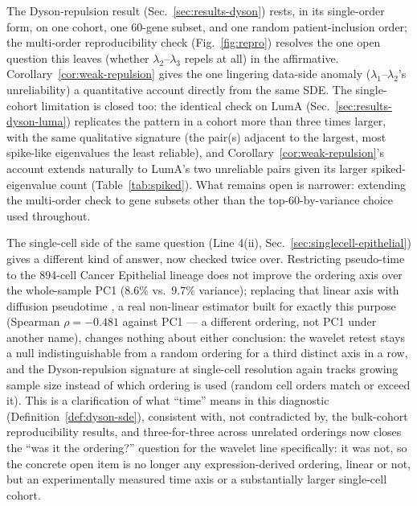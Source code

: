 \documentclass[11pt]{article}
\begin{document}
The Dyson-repulsion result (Sec.~\ref{sec:results-dyson}) rests, in its
single-order form, on one cohort, one 60-gene subset, and one random
patient-inclusion order; the multi-order reproducibility check
(Fig.~\ref{fig:repro}) resolves the one open question this leaves
(whether $\lambda_2$--$\lambda_3$ repels at all) in the affirmative.
Corollary~\ref{cor:weak-repulsion} gives the one lingering data-side
anomaly ($\lambda_1$--$\lambda_2$'s unreliability) a quantitative
account directly from the same SDE. The single-cohort limitation is
closed too: the identical check on LumA
(Sec.~\ref{sec:results-dyson-luma}) replicates the pattern in a cohort
more than three times larger, with the same qualitative signature
(the pair(s) adjacent to the largest, most spike-like eigenvalues the
least reliable), and Corollary~\ref{cor:weak-repulsion}'s account
extends naturally to LumA's two unreliable pairs given its larger
spiked-eigenvalue count (Table~\ref{tab:spiked}). What remains open is
narrower: extending the multi-order check to gene subsets other than
the top-60-by-variance choice used throughout.

The single-cell side of the same question (Line 4(ii),
Sec.~\ref{sec:singlecell-epithelial}) gives a different kind of answer,
now checked twice over. Restricting pseudo-time to the 894-cell Cancer
Epithelial lineage does not improve the ordering axis over the
whole-sample PC1 ($8.6\%$ vs.\ $9.7\%$ variance); replacing that linear
axis with diffusion pseudotime \citep{haghverdi2016}, a real
non-linear estimator built for exactly this purpose (Spearman
$\rho=-0.481$ against PC1 --- a different ordering, not PC1
under another name), changes nothing about either conclusion: the
wavelet retest stays a null indistinguishable from a random ordering
for a third distinct axis in a row, and the Dyson-repulsion signature
at single-cell resolution again tracks growing sample size instead of
which ordering is used (random cell orders match or exceed it). This is
a clarification of what ``time'' means in this diagnostic
(Definition~\ref{def:dyson-sde}), consistent with, not contradicted by,
the bulk-cohort reproducibility results, and three-for-three across
unrelated orderings now closes the ``was it the ordering?'' question for
the wavelet line specifically: it was not, so the concrete open item is
no longer any expression-derived ordering, linear or not, but an
experimentally measured time axis or a substantially larger single-cell
cohort.
\end{document}
